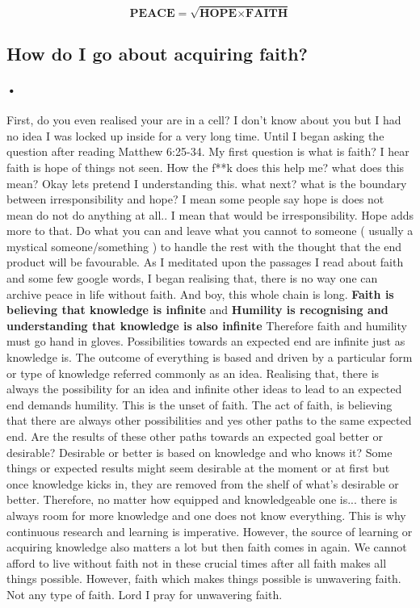 \documentclass{article}[12pt]
\begin{document}
\begin{equation}
    \label{simple_equation}
    \textbf{PEACE} = \sqrt{\textbf{HOPE}\times \textbf{FAITH} }
\end{equation}

\subsection{How do I go about acquiring faith?}

\paragraph*{•}
First, do you even realised your are in a cell? I don't know about you but I had no idea I was locked up inside for a very long time.
Until I began asking the question after reading Matthew 6:25-34. My first question is what is faith?  I hear faith is hope of things not seen.
How the f**k does this help me? what does this mean?
Okay lets pretend I understanding this. what next? what is the boundary between irresponsibility and hope?
I mean some people say hope is does not mean do not do anything at all.. I mean that would be irresponsibility. Hope adds more to that. Do what you can and leave what you cannot to someone ( usually a mystical someone/something ) to handle the rest with the thought that the end product will be favourable.
\newline
As I meditated upon the passages I read about faith and some few google words, I began realising that, there is no way one can archive peace in life without faith. And boy, this whole chain is long.
\newline
\textbf{Faith is believing that knowledge is infinite}
and \textbf{Humility is recognising and understanding that knowledge is also infinite}
Therefore faith and humility must go hand in gloves. Possibilities towards an expected end are infinite just as knowledge is. The outcome of everything is based and driven by a particular form or type of knowledge referred commonly as an idea.
Realising that, there is always the possibility for an idea and infinite other ideas to lead to an expected end demands humility. This is the unset of faith.
The act of faith, is believing that there are always other possibilities and yes other paths to the same expected end. Are the results of these other paths towards an expected goal better or desirable? Desirable or better is based on knowledge and who knows it? Some things or expected results might seem desirable at the moment or at first but once knowledge kicks in, they are removed from the shelf of what’s desirable or better.
Therefore, no matter how equipped and knowledgeable one is... there is always room for more knowledge and one does not know everything. This is why continuous research and learning is imperative. However, the source of learning or acquiring knowledge also matters a lot but then faith comes in again.
We cannot afford to live without faith not in these crucial times after all faith makes all things possible. However, faith which makes things possible is unwavering faith. Not any type of faith.
Lord I pray for unwavering faith.
\end{document}
